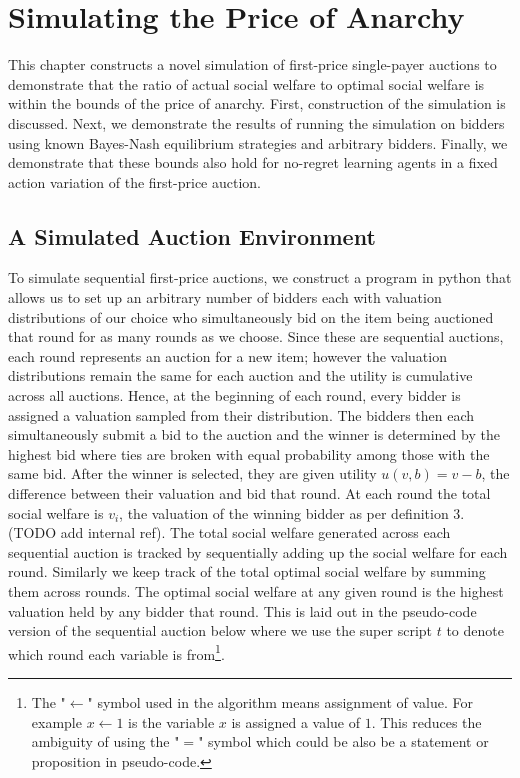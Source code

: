 \documentclass[12pt,twoside]{reedthesis}
\begin{document}
\chapter{Simulating the Price of Anarchy}

This chapter constructs a novel simulation of first-price single-payer auctions to demonstrate that the ratio of actual social welfare to optimal social welfare is within the bounds of the price of anarchy. First, construction of the simulation is discussed. Next, we demonstrate the results of running the simulation on bidders using known Bayes-Nash equilibrium strategies and arbitrary bidders. Finally, we demonstrate that these bounds also hold for no-regret learning agents in a fixed action variation of the first-price auction.

\section{A Simulated Auction Environment}

To simulate sequential first-price auctions, we construct a program in python that allows us to set up an arbitrary number of bidders each with valuation distributions of our choice who simultaneously bid on the item being auctioned that round for as many rounds as we choose. Since these are sequential auctions, each round represents an auction for a new item; however the valuation distributions remain the same for each auction and the utility is cumulative across all auctions. Hence, at the beginning of each round, every bidder is assigned a valuation sampled from their distribution. The bidders then each simultaneously submit a bid to the auction and the winner is determined by the highest bid where ties are broken with equal probability among those with the same bid. After the winner is selected, they are given utility $u(v, b) = v - b$, the difference between their valuation and bid that round. At each round the total social welfare is $v_i$, the valuation of the winning bidder as per definition 3. (TODO add internal ref). The total social welfare generated across each sequential auction is tracked by sequentially adding up the social welfare for each round. Similarly we keep track of the total optimal social welfare by summing them across rounds. The optimal social welfare at any given round is the highest valuation held by any bidder that round. This is laid out in the pseudo-code version of the sequential auction below where we use the super script $t$ to denote which round each variable is from\footnote{The "$\leftarrow$" symbol used in the algorithm means assignment of value. For example $x \leftarrow 1$ is the variable $x$ is assigned a value of $1$. This reduces the ambiguity of using the "$=$" symbol which could be also be a statement or proposition in pseudo-code.}.\\
\end{document}
